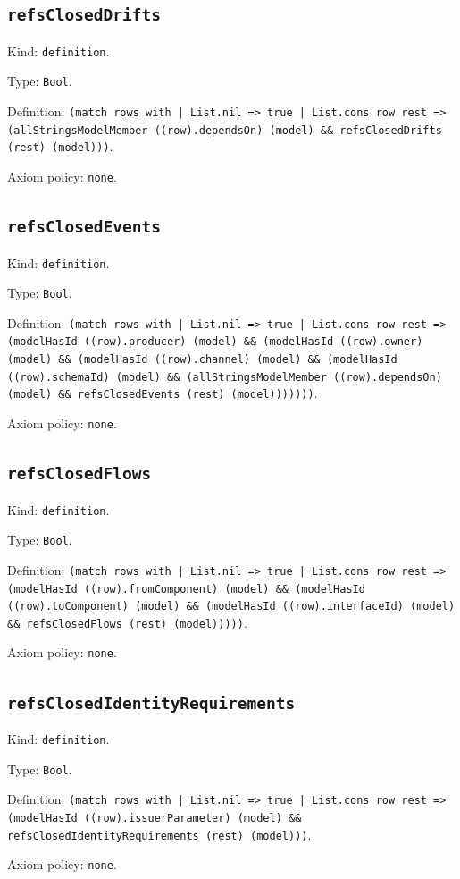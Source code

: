 \documentclass[11pt]{article}
\begin{document}
\subsection*{\texttt{refsClosedDrifts}}
\noindent Kind: \texttt{definition}.\par
\noindent Type: \texttt{Bool}.\par
\noindent Definition: \texttt{(match rows with | List.nil => true | List.cons row rest => (allStringsModelMember ((row).dependsOn) (model) \&\& refsClosedDrifts (rest) (model)))}.\par
\noindent Axiom policy: \texttt{none}.\par
\subsection*{\texttt{refsClosedEvents}}
\noindent Kind: \texttt{definition}.\par
\noindent Type: \texttt{Bool}.\par
\noindent Definition: \texttt{(match rows with | List.nil => true | List.cons row rest => (modelHasId ((row).producer) (model) \&\& (modelHasId ((row).owner) (model) \&\& (modelHasId ((row).channel) (model) \&\& (modelHasId ((row).schemaId) (model) \&\& (allStringsModelMember ((row).dependsOn) (model) \&\& refsClosedEvents (rest) (model)))))))}.\par
\noindent Axiom policy: \texttt{none}.\par
\subsection*{\texttt{refsClosedFlows}}
\noindent Kind: \texttt{definition}.\par
\noindent Type: \texttt{Bool}.\par
\noindent Definition: \texttt{(match rows with | List.nil => true | List.cons row rest => (modelHasId ((row).fromComponent) (model) \&\& (modelHasId ((row).toComponent) (model) \&\& (modelHasId ((row).interfaceId) (model) \&\& refsClosedFlows (rest) (model)))))}.\par
\noindent Axiom policy: \texttt{none}.\par
\subsection*{\texttt{refsClosedIdentityRequirements}}
\noindent Kind: \texttt{definition}.\par
\noindent Type: \texttt{Bool}.\par
\noindent Definition: \texttt{(match rows with | List.nil => true | List.cons row rest => (modelHasId ((row).issuerParameter) (model) \&\& refsClosedIdentityRequirements (rest) (model)))}.\par
\noindent Axiom policy: \texttt{none}.\par
\end{document}

